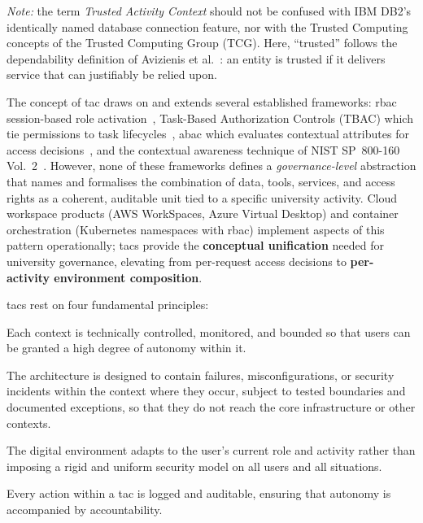 \smallskip\noindent
\emph{Note:} the term \emph{Trusted Activity Context} should not be
confused with IBM DB2's identically named database connection
feature, nor with the Trusted Computing concepts of the Trusted
Computing Group (TCG). Here, ``trusted'' follows the dependability
definition of Avizienis et al.~\cite{avizienis2004}: an entity is
trusted if it delivers service that can justifiably be relied upon.

\medskip\noindent
The concept of \gls{tac} draws on and extends several established
frameworks: \gls{rbac} session-based role activation~\cite{sandhu1996},
Task-Based Authorization Controls (TBAC) which tie permissions to
task lifecycles~\cite{thomas-sandhu1997}, \gls{abac} which evaluates
contextual attributes for access decisions~\cite{nist-sp800-162},
and the contextual awareness technique of NIST SP~800-160
Vol.~2~\cite{nist-sp800-160v2}. However, none of these frameworks
defines a \emph{governance-level} abstraction that names and formalises
the combination of data, tools, services, and access rights as a
coherent, auditable unit tied to a specific university activity.
Cloud workspace products (AWS WorkSpaces, Azure Virtual Desktop) and
container orchestration (Kubernetes namespaces with \gls{rbac}) implement
aspects of this pattern operationally; \gls{tac}s provide the
\textbf{conceptual unification} needed for university governance,
elevating from per-request access decisions to
\textbf{per-activity environment composition}.

\medskip\noindent
\gls{tac}s rest on four fundamental principles:

\begin{description}[style=nextline, leftmargin=1.5cm, nosep]
    \item[\textsc{Trustworthiness}] Each context is technically
    controlled, monitored, and bounded so that users can be granted a
    high degree of autonomy within it.

    \item[\textsc{Dependability}] The architecture is designed to
    contain failures, misconfigurations, or security incidents within
    the context where they occur, subject to tested boundaries and
    documented exceptions, so that they do not reach the core
    infrastructure or other contexts.

    \item[\textsc{User-centricity}] The digital environment adapts to
    the user's current role and activity rather than imposing a rigid
    and uniform security model on all users and all situations.

    \item[\textsc{Observability}] Every action within a \gls{tac} is logged
    and auditable, ensuring that autonomy is accompanied by
    accountability.
\end{description}

